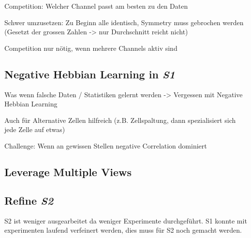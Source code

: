Competition: Welcher Channel passt am besten zu den Daten


Schwer umzusetzen: Zu Beginn alle identisch, Symmetry muss gebrochen werden (Gesetzt der grossen Zahlen -> nur Durchschnitt reicht nicht)


Competition nur nötig, wenn mehrere Channels aktiv sind


\subsection{Negative Hebbian Learning in \emph{S1}}


Was wenn falsche Daten / Statistiken gelernt werden -> Vergessen mit Negative Hebbian Learning

Auch für Alternative Zellen hilfreich (z.B. Zellspaltung, dann spezialisiert sich jede Zelle auf etwas)

 Challenge: Wenn an gewissen Stellen negative Correlation dominiert


\subsection{Leverage Multiple Views}


\subsection{Refine \emph{S2}}

S2 ist weniger ausgearbeitet da weniger Experimente durchgeführt. S1 konnte mit experimenten laufend verfeinert werden, dies muss für S2 noch gemacht werden.